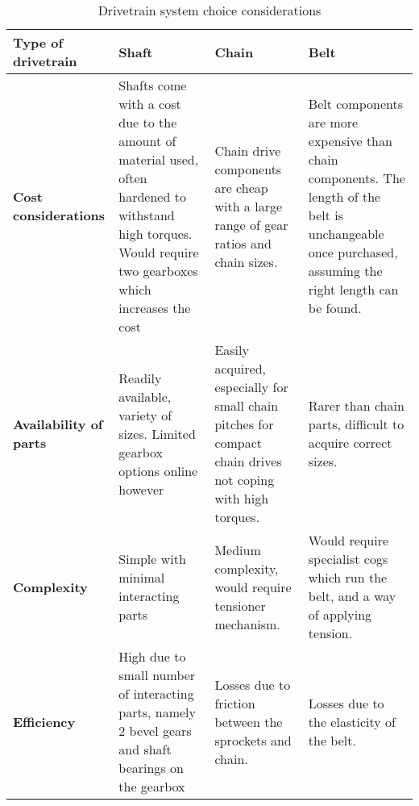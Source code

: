 \begin{table}[!htb]
\caption{Drivetrain system choice considerations}
\label{tab:drivetrainChoices}
\centering
\begin{tabular}{|
>{\columncolor[HTML]{\CellColor}}l |p{4cm}|p{4cm}|p{4cm}|}
\hline
\textbf{Type of drivetrain}      & \cellcolor[HTML]{\CellColor}\textbf{Shaft}                                                                                                                       & \cellcolor[HTML]{\CellColor}\textbf{Chain}                                                                     & \cellcolor[HTML]{\CellColor}\textbf{Belt}                                                                                                                    \\ \hline
\textbf{Cost   considerations}   & Shafts come with a cost due to the   amount of material used, often hardened to withstand high torques. Would   require two gearboxes which increases the cost & Chain drive components are cheap with a large range of gear ratios and chain sizes.                        & Belt components are more expensive than chain components. The length of the belt is unchangeable once purchased, assuming the right length can be found. \\ \hline
\textbf{Availability   of parts} & Readily available, variety of   sizes. Limited gearbox options online however                                                                                & Easily acquired, especially for small chain pitches for compact chain drives not coping with high torques. & Rarer than chain parts, difficult to acquire correct sizes.                                                                                              \\ \hline
\textbf{Complexity}              & Simple with minimal interacting   parts                                                                                                                      & Medium complexity, would require tensioner mechanism.                                                      & Would require specialist cogs which run the belt, and a way of applying tension.                                                                         \\ \hline
\textbf{Efficiency}              & High due to small number of   interacting parts, namely 2 bevel gears and shaft bearings on the gearbox                                                      & Losses due to friction between the sprockets and chain.                                                    & Losses due to the elasticity of the belt.                                                                                                                \\ \hline

\end{tabular}
\end{table}
